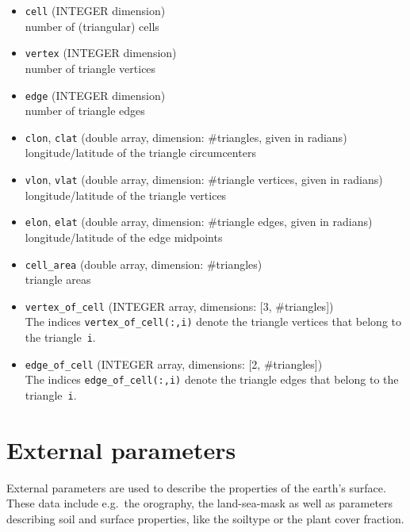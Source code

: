 \begin{itemize}
 \item \texttt{cell} (INTEGER dimension) \\
        number of (triangular) cells
 \item \texttt{vertex} (INTEGER dimension) \\
        number of triangle vertices
 \item \texttt{edge} (INTEGER dimension) \\
        number of triangle edges
 \item \texttt{clon}, \texttt{clat} (double array, dimension: \#triangles, given in radians) \\
        longitude/latitude of the triangle circumcenters
 \item \texttt{vlon}, \texttt{vlat} (double array, dimension: \#triangle vertices, given in radians) \\
        longitude/latitude of the triangle vertices
 \item \texttt{elon}, \texttt{elat} (double array, dimension: \#triangle edges, given in radians) \\
       longitude/latitude of the edge midpoints
 \item \texttt{cell\_area} (double array, dimension: \#triangles) \\
       triangle areas
 \item \texttt{vertex\_of\_cell} (INTEGER array, dimensions: [3, \#triangles]) \\
       The indices \texttt{vertex\_of\_cell(:,i)} denote the triangle vertices that belong 
       to the triangle~\texttt{i}.
 \item \texttt{edge\_of\_cell} (INTEGER array, dimensions: [2, \#triangles]) \\
       The indices \texttt{edge\_of\_cell(:,i)} denote the triangle edges that belong
       to the triangle~\texttt{i}.
\end{itemize}



\section{External parameters}
\label{section:extpar}
External parameters are used to describe the properties of the earth's surface. 
These data include e.g.\ the orography, the land-sea-mask as well as parameters describing 
soil and surface properties, like the soiltype or the plant cover fraction.

